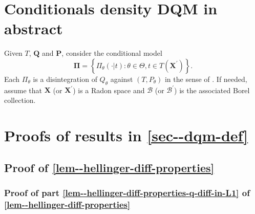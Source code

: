 \documentclass[12pt]{article}
\let\Cref\autoref
\theoremstyle{definition}
\theoremstyle{plain}
\begin{document}
\section{Conditionals density DQM in abstract}
\label{sec--joint-marg-cond}

Given \(T\), \(\mathbf{Q}\) and \(\mathbf{P}\), consider the conditional model
\begin{equation*}
  \bm{\Pi} = \left\{ \Pi_{\theta} (\cdot | t) : \theta \in \Theta, t \in T
  \left( \mathbf{X}^{\prime} \right) \right\}.
\end{equation*}
Each \(\Pi_{\theta}\) is a disintegration of \(Q_{\theta}\) against \(\left( T,
P_{\theta} \right)\) in the sense of
\citet{1997changConditioningAsDisintegration}.
If needed, assume that \(\mathbf{X}\) (or \(\mathbf{X}^{\prime}\)) is a Radon
space and \(\mathcal{B}\) (or \(\mathcal{B}^{\prime}\)) is the associated Borel
collection.



\printbibliography

\appendix

\newpage

\section{Proofs of results in \Cref{sec--dqm-def}}

\subsection{Proof of \Cref{lem--hellinger-diff-properties}}
\label{sec--prf--lem--hellinger-diff-properties}

\subsubsection{Proof of part \ref{lem--hellinger-diff-properties-q-diff-in-L1}
of \Cref{lem--hellinger-diff-properties}}
\end{document}
